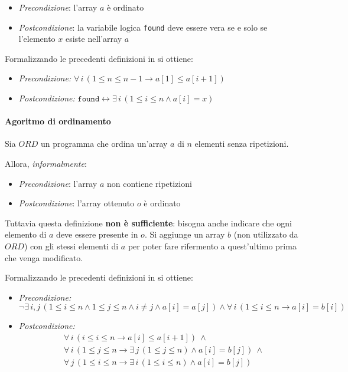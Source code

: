 \documentclass[italian, 10pt]{article}
\begin{document}
\begin{itemize}
  \item \textit{Precondizione}: l'array \(a\) è ordinato
  \item \textit{Postcondizione}: la variabile logica \texttt{found} deve essere vera se e solo se l'elemento \(x\) esiste nell'array \(a\)
\end{itemize}

Formalizzando le precedenti definizioni in \FOL si ottiene:

\begin{itemize}
  \item \textit{Precondizione:} \(\forall \, i \, (1 \leq n \leq n-1 \rightarrow a[1] \leq a[i+1])\)
  \item \textit{Postcondizione:} \(\texttt{found} \leftrightarrow \exists \, i \, (1 \leq i \leq n \land a[i] = x)\)
\end{itemize}

\paragraph{Agoritmo di ordinamento}

Sia \(ORD\) un programma che ordina un'array \(a\) di \(n\) elementi senza ripetizioni.

Allora, \textit{informalmente}:

\begin{itemize}
  \item \textit{Precondizione}: l'array \(a\) non contiene ripetizioni
  \item \textit{Postcondizione}: l'array ottenuto \(o\) è ordinato
\end{itemize}

Tuttavia questa definizione \textbf{non è sufficiente}: bisogna anche indicare che ogni elemento di \(a\) deve essere presente in \(o\).
Si aggiunge un array \(b\) (non utilizzato da \(ORD\)) con gli stessi elementi di \(a\) per poter fare rifermento a quest'ultimo prima che venga modificato.

Formalizzando le precedenti definizioni in \FOL si ottiene:

\begin{itemize}
  \item \textit{Precondizione:} \[\lnot \exists \, i, j \, (1 \leq i \leq n \land 1 \leq j \leq n \land i \neq j \land a[i] = a[j]) \land \forall \, i \, (1 \leq i \leq n \rightarrow a[i] = b[i])\]
  \item \textit{Postcondizione:}
        \begin{align*}
           & \forall \, i \, (i \leq i \leq n \rightarrow a[i] \leq a[i+1]) \ \land                                    \\
           & \forall \, i \, (1 \leq j \leq n \rightarrow \exists \, j \, (1 \leq j \leq n) \land a[i] = b[j]) \ \land \\
           & \forall \, j \, (1 \leq i \leq n \rightarrow \exists \, i \, (1 \leq i \leq n) \land a[i] = b[j])
        \end{align*}
\end{itemize}
\end{document}
